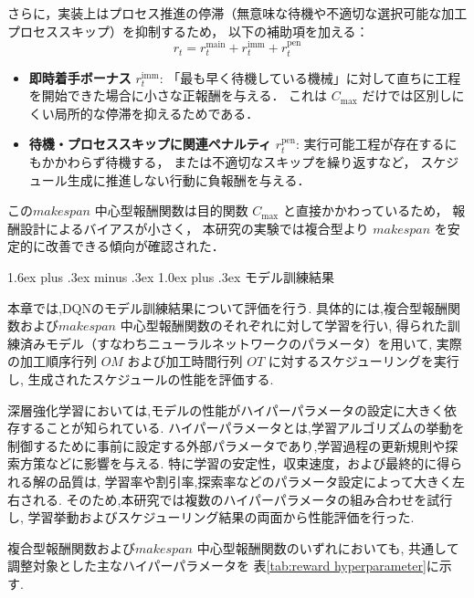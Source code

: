\documentclass{jarticle}
\makeatletter
\renewcommand{\subsection}{%
  \@startsection{subsection}{2}{\z@}%
  {1.6ex plus .3ex minus .3ex}%
  {1.0ex plus .3ex}%
  {\LARGE\bfseries}%
}
\makeatother
\begin{document}
さらに，実装上はプロセス推進の停滞（無意味な待機や不適切な選択可能な加工プロセススキップ）を抑制するため，
以下の補助項を加える：
\begin{equation}
\label{eq:reward_makespan_total}
r_t = r_t^{\mathrm{main}} + r_t^{\mathrm{imm}} + r_t^{\mathrm{pen}}
\end{equation}

\begin{itemize}
  \item \textbf{即時着手ボーナス} $r_t^{\mathrm{imm}}$:
  「最も早く待機している機械」に対して直ちに工程を開始できた場合に小さな正報酬を与える．
  これは $C_{\max}$ だけでは区別しにくい局所的な停滞を抑えるためである．

  \item \textbf{待機・プロセススキップに関連ペナルティ} $r_t^{\mathrm{pen}}$:
  実行可能工程が存在するにもかかわらず待機する，
  または不適切なスキップを繰り返すなど，
  スケジュール生成に推進しない行動に負報酬を与える．
\end{itemize}

この$makespan$ 中心型報酬関数は目的関数 $C_{\max}$ と直接かかわっているため，
報酬設計によるバイアスが小さく，
本研究の実験では複合型より $makespan$ を安定的に改善できる傾向が確認された．

\subsection{モデル訓練結果}

本章では,DQNのモデル訓練結果について評価を行う.
具体的には,複合型報酬関数および$makespan$ 中心型報酬関数のそれぞれに対して学習を行い,
得られた訓練済みモデル（すなわちニューラルネットワークのパラメータ）を用いて,
実際の加工順序行列 $OM$ および加工時間行列 $OT$ に対するスケジューリングを実行し,
生成されたスケジュールの性能を評価する.

深層強化学習においては,モデルの性能がハイパーパラメータの設定に大きく依存することが知られている.
ハイパーパラメータとは,学習アルゴリズムの挙動を制御するために事前に設定する外部パラメータであり,学習過程の更新規則や探索方策などに影響を与える.
特に学習の安定性，収束速度，および最終的に得られる解の品質は,
学習率や割引率,探索率などのパラメータ設定によって大きく左右される.
そのため,本研究では複数のハイパーパラメータの組み合わせを試行し,
学習挙動およびスケジューリング結果の両面から性能評価を行った.

複合型報酬関数および$makespan$ 中心型報酬関数のいずれにおいても,
共通して調整対象とした主なハイパーパラメータを
表\ref{tab:reward hyperparameter}に示す.
\end{document}
